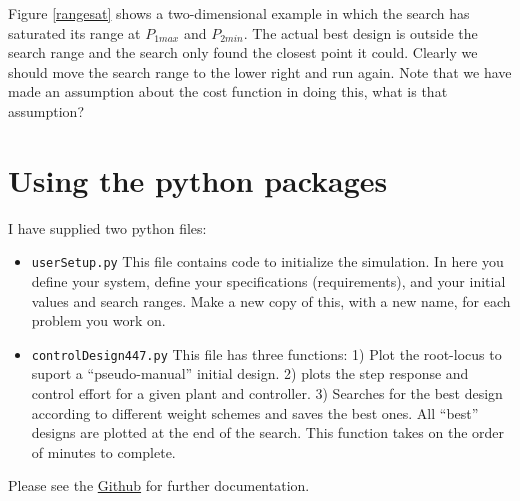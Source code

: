Figure \ref{rangesat} shows a two-dimensional example in which the search has saturated its range at $P_{1max}$ and $P_{2min}$.  The actual best design is outside the search range and the search only found the closest point it could.   Clearly we should move the search range to the lower right and run again.   Note that we have made an assumption about the cost function in doing this, what is that assumption?	%





\section{Using the python packages}

I have supplied two python files:
\begin{itemize}
  \item {\tt userSetup.py}
This file contains code to initialize the simulation.  In here you define your system, define your specifications (requirements), and your initial values and search ranges.  Make a new copy of this, with a new name, for each problem you work on.
  \item {\tt controlDesign447.py}
  This file has three functions:  1) Plot the root-locus to suport a ``pseudo-manual'' initial design.
  2) plots the step response and control effort for a given plant and controller.
  3) Searches for the best design according to different weight schemes and saves the best ones.  All ``best'' designs are plotted at the end of the search.  This function takes on the order of minutes to complete.
\end{itemize}
Please see the \href{https://github.com/uw-biorobotics/controlDesigner447}{Github} for further documentation.



%
%
%
%
%



